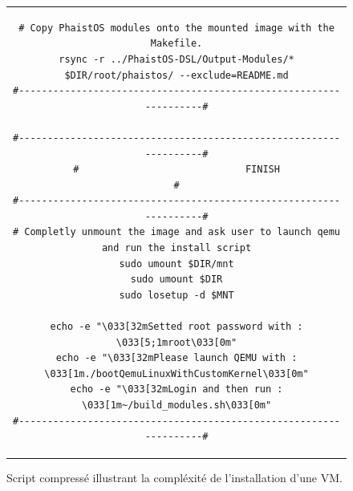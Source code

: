\begin{figure}[h!t]
\begin{tabular}{c}
\begin{lstlisting}[style=customShell]
# Copy PhaistOS modules onto the mounted image with the Makefile.
rsync -r ../PhaistOS-DSL/Output-Modules/* $DIR/root/phaistos/ --exclude=README.md
#------------------------------------------------------------------#

#------------------------------------------------------------------#
#                             FINISH                               #
#------------------------------------------------------------------#
# Completly unmount the image and ask user to launch qemu and run the install script
sudo umount $DIR/mnt
sudo umount $DIR
sudo losetup -d $MNT

echo -e "\033[32mSetted root password with : \033[5;1mroot\033[0m"
echo -e "\033[32mPlease launch QEMU with : \033[1m./bootQemuLinuxWithCustomKernel\033[0m"
echo -e "\033[32mLogin and then run : \033[1m~/build_modules.sh\033[0m"
#------------------------------------------------------------------#
        \end{lstlisting}
    \end{tabular}
    \caption{Script compressé illustrant la compléxité de l'installation d'une VM.}
    \label{fig:script}
\end{figure}
